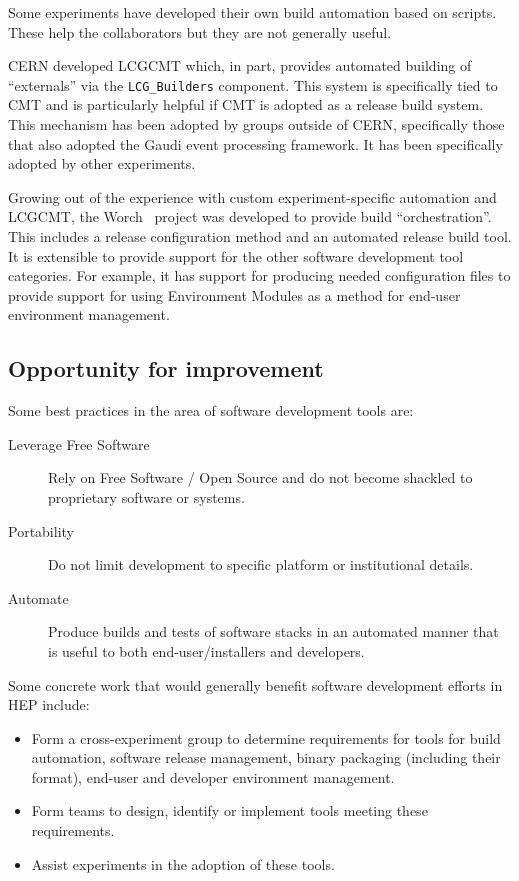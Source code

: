 Some experiments have developed their own build automation based on
scripts.  These help the collaborators but they are not generally
useful.

CERN developed LCGCMT which, in part, provides automated building of
``externals'' via the \verb|LCG_Builders| component.  This system is
specifically tied to CMT and is particularly helpful if CMT is adopted
as a release build system.  This mechanism has been adopted by groups
outside of CERN, specifically those that also adopted the Gaudi event
processing framework.  It has been specifically adopted by other
experiments.

Growing out of the experience with custom experiment-specific
automation and LCGCMT, the Worch~\cite{worch} project was developed to provide
build ``orchestration''.  This includes a release configuration method
and an automated release build tool.  It is extensible to provide
support for the other software development tool categories.  For
example, it has support for producing needed configuration files to
provide support for using Environment Modules as a method for end-user
environment management.


\subsection{Opportunity for improvement}

Some best practices in the area of software development tools are:

\begin{description}
\item[Leverage Free Software] Rely on Free Software / Open Source and
  do not become shackled to proprietary software or systems.
\item[Portability] Do not limit development to specific platform or
  institutional details.
\item[Automate] Produce builds and tests of software stacks in an
  automated manner that is useful to both end-user/installers and
  developers.
\end{description}

\noindent Some concrete work that would generally benefit software development efforts in HEP include:

\begin{itemize}
\item Form a cross-experiment group to determine requirements for
  tools for build automation, software release management, binary
  packaging (including their format), end-user and developer
  environment management.
\item Form teams to design, identify or implement tools meeting these
  requirements.
\item Assist experiments in the adoption of these tools.
\end{itemize}

